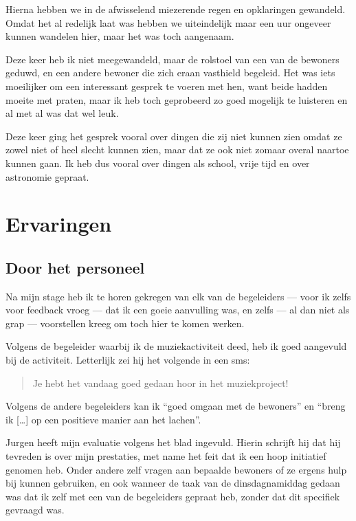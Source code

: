 \documentclass[a4paper,12pt]{article}
\begin{document}
Hierna hebben we in de afwisselend miezerende regen en opklaringen gewandeld. Omdat het al redelijk laat was hebben we uiteindelijk maar een uur ongeveer kunnen wandelen hier, maar het was toch aangenaam.

Deze keer heb ik niet meegewandeld, maar de rolstoel van een van de bewoners geduwd, en een andere bewoner die zich eraan vasthield begeleid. Het was iets moeilijker om een interessant gesprek te voeren met hen, want beide hadden moeite met praten, maar ik heb toch geprobeerd zo goed mogelijk te luisteren en al met al was dat wel leuk.

Deze keer ging het gesprek vooral over dingen die zij niet kunnen zien omdat ze zowel niet of heel slecht kunnen zien, maar dat ze ook niet zomaar overal naartoe kunnen gaan. Ik heb dus vooral over dingen als school, vrije tijd en over astronomie gepraat.

\section{Ervaringen}

\subsection{Door het personeel}
Na mijn stage heb ik te horen gekregen van elk van de begeleiders --- voor ik zelfs voor feedback vroeg --- dat ik een goeie aanvulling was, en zelfs --- al dan niet als grap --- voorstellen kreeg om toch hier te komen werken.

Volgens de begeleider waarbij ik de muziekactiviteit deed, heb ik goed aangevuld bij de activiteit. Letterlijk zei hij het volgende in een sms:

\begin{quotation}
  Je hebt het vandaag goed gedaan hoor in het muziekproject!
\end{quotation}

Volgens de andere begeleiders kan ik ``goed omgaan met de bewoners'' en ``breng ik [\dots] op een positieve manier aan het lachen''.

Jurgen heeft mijn evaluatie volgens het blad ingevuld. Hierin schrijft hij dat hij tevreden is over mijn prestaties, met name het feit dat ik een hoop initiatief genomen heb. Onder andere zelf vragen aan bepaalde bewoners of ze ergens hulp bij kunnen gebruiken, en ook wanneer de taak van de dinsdagnamiddag gedaan was dat ik zelf met een van de begeleiders gepraat heb, zonder dat dit specifiek gevraagd was.
\end{document}
